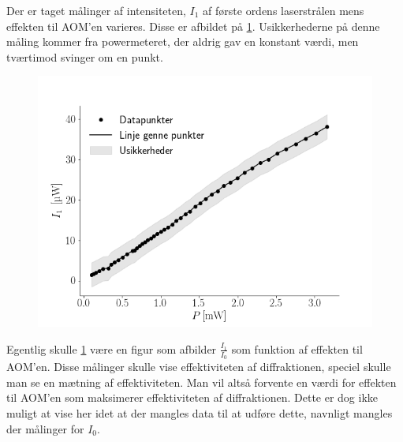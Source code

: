 \documentclass[main]{subfiles}
\begin{document}
\bigskip

Der er taget målinger af intensiteten, $I_1$ af første ordens laserstrålen mens effekten til AOM'en varieres. Disse er afbildet på \cref{fig:graf2}. Usikkerhederne på denne måling kommer fra  powermeteret, der aldrig gav en konstant værdi, men tværtimod svinger om en punkt. %

\begin{figure}[H]
    \centering
    \includegraphics[width=\linewidth]{tegninger/graf2.png}
    \caption{}
    \label{fig:graf2}
\end{figure}
Egentlig skulle \cref{fig:graf2} være en figur som afbilder $\frac{I_1}{I_0}$ som funktion af effekten til AOM'en. Disse målinger skulle vise effektiviteten af diffraktionen, speciel skulle man se en mætning af effektiviteten. Man vil altså forvente en værdi for effekten til AOM'en som maksimerer effektiviteten af diffraktionen. Dette er dog ikke muligt at vise her idet at der mangles data til at udføre dette, navnligt mangles der målinger for $I_0$.
\end{document}
